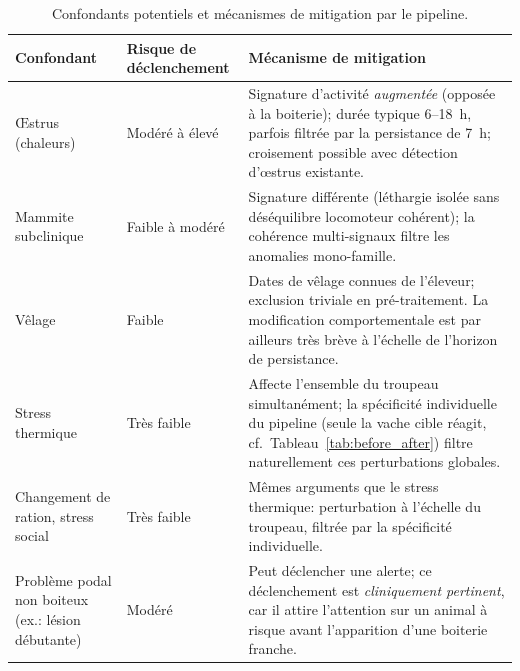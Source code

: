\begin{table}[H]
    \centering
    \caption{Confondants potentiels et mécanismes de mitigation par le pipeline.}
    \label{tab:confondants}
    \small
    \begin{tabular}{p{3.0cm}p{3.5cm}p{7.0cm}}
        \toprule
        \textbf{Confondant} & \textbf{Risque de déclenchement}
            & \textbf{Mécanisme de mitigation} \\
        \midrule
        Œstrus (chaleurs)
            & Modéré à élevé
            & Signature d'activité \textit{augmentée} (opposée à la boiterie);
              durée typique 6--18~h, parfois filtrée par la persistance de 7~h;
              croisement possible avec détection d'œstrus existante. \\
        \addlinespace
        Mammite subclinique
            & Faible à modéré
            & Signature différente (léthargie isolée sans déséquilibre locomoteur
              cohérent); la cohérence multi-signaux filtre les anomalies
              mono-famille. \\
        \addlinespace
        Vêlage
            & Faible
            & Dates de vêlage connues de l'éleveur; exclusion triviale en
              pré-traitement. La modification comportementale est par ailleurs
              très brève à l'échelle de l'horizon de persistance. \\
        \addlinespace
        Stress thermique
            & Très faible
            & Affecte l'ensemble du troupeau simultanément; la spécificité
              individuelle du pipeline (seule la vache cible réagit,
              cf.~Tableau~\ref{tab:before_after}) filtre naturellement ces
              perturbations globales. \\
        \addlinespace
        Changement de ration, stress social
            & Très faible
            & Mêmes arguments que le stress thermique: perturbation à l'échelle
              du troupeau, filtrée par la spécificité individuelle. \\
        \addlinespace
        Problème podal non boiteux (ex.: lésion débutante)
            & Modéré
            & Peut déclencher une alerte; ce déclenchement est \textit{cliniquement
              pertinent}, car il attire l'attention sur un animal à risque avant
              l'apparition d'une boiterie franche. \\
        \bottomrule
    \end{tabular}
\end{table}

